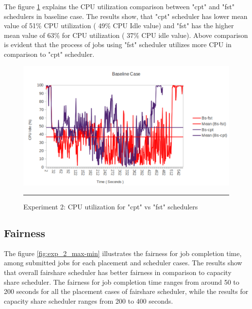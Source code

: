 The figure \ref{fig:exp2_cpu_cpt_vs_fst} explains the CPU utilization comparison between "cpt" and "fst" schedulers in baseline case. The results show, that "cpt" scheduler has lower mean value of 51\% CPU utilization ( 49\% CPU Idle value) and "fst" has the higher mean value of 63\% for CPU utilization ( 37\% CPU idle value). Above comparison is evident that the process of jobs using "fst" scheduler utilizes more CPU in comparison to "cpt" scheduler. \\ 


 
 \begin{figure}[htbp]
  \centering
    \includegraphics[width=\textwidth,height=\textheight,keepaspectratio]{./Figures/exp2_cpu_cpt_vs_fst.pdf}
    \rule{35em}{0.5pt}
  \caption{Experiment 2: CPU‌ utilization for "cpt" vs "fst" schedulers}
  \label{fig:exp2_cpu_cpt_vs_fst}
\end{figure} 








 \subsection{Fairness}
 The figure \ref{fig:exp_2_max-min} illustrates the fairness for job completion time, among submitted jobs for each placement and scheduler cases. The results show that overall fairshare scheduler has  better fairness in comparison to capacity share scheduler. The fairness for job completion time ranges from around 50 to 200 seconds for all the placement cases of fairshare scheduler, while the results for capacity share scheduler ranges from 200 to 400 seconds.\\ 
 
 
 
